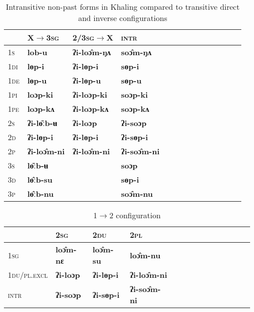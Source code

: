 \documentclass{article}
\newcommand{\ipa}[1]{{\phon\textbf{#1}}}
\newcommand{\grise}[1]{\cellcolor{lightgray}\textbf{#1}}
\newcommand{\bleu}[1]{\cellcolor{blue!30}\textbf{#1}}
\begin{document}
\begin{table}[H]
\caption{Intransitive non-past forms in Khaling compared to transitive direct and inverse configurations} \label{tab:nonloc} \centering
\begin{tabular}{llllllllllllll}
 \toprule
 &	X$\rightarrow$\textsc{3sg} &	\textsc{2/3sg}$\rightarrow$X &	\textsc{intr} &	\\	
 \midrule
\textsc{1s} &	\ipa{lob-u} \bleu{}&	\ipa{ʔi-loɔ̂m-ŋʌ} &	\ipa{soɔ̂m-ŋʌ} &	\\	
\textsc{1di} &	\ipa{lɵp-i} &	\ipa{ʔi-lɵp-i} &	\ipa{sɵp-i} &	\\	
\textsc{1de} &	\ipa{lɵp-u} &	\ipa{ʔi-lɵp-u} &	\ipa{sɵp-u} &	\\	
\textsc{1pi} &	\ipa{loɔp-ki} &	\ipa{ʔi-loɔp-ki} &	\ipa{soɔp-ki} &	\\	
\textsc{1pe} &	\ipa{loɔp-kʌ} &	\ipa{ʔi-loɔp-kʌ} &	\ipa{soɔp-kʌ} &	\\	
\textsc{2s} &	\ipa{ʔi-lɵ̄ːb-ʉ} \bleu{}&	\ipa{ʔi-loɔp} &	\ipa{ʔi-soɔp} &	\\	
\textsc{2d} &	\ipa{ʔi-lɵp-i} &	\ipa{ʔi-lɵp-i} &	\ipa{ʔi-sɵp-i} &	\\	
\textsc{2p} &	\ipa{ʔi-loɔ̂m-ni} &	\ipa{ʔi-loɔ̂m-ni} &	\ipa{ʔi-soɔ̂m-ni} &	\\	
\textsc{3s} &	\ipa{lɵ̄ːb-ʉ} \bleu{}&	 \grise{} &	\ipa{soɔp} &	\\	
\textsc{3d} &	\ipa{lɵ̂ːb-su} \bleu{}&	\grise{} &	\ipa{sɵp-i} &	\\	
\textsc{3p} &	\ipa{lɵ̂ːb-nu} \bleu{}&	\grise{} &	\ipa{soɔ̂m-nu} &	\\	
\bottomrule
\end{tabular}
\end{table}

\begin{table}[H]
\caption{1$\rightarrow$2 configuration} \label{tab:loc} \centering
\begin{tabular}{llllllllllllll}
 \toprule
  &	\textsc{2sg} &	\textsc{2du} &	\textsc{2pl} &	\\
   \midrule
\textsc{1sg} &	\ipa{loɔ̂m-nɛ} \bleu{}&	\ipa{loɔ̂m-su} \bleu{}&	\ipa{loɔ̂m-nu} \bleu{}&	\\
\textsc{1du/pl.excl }&	\ipa{ʔi-loɔp} &	\ipa{ʔi-lɵp-i} &	\ipa{ʔi-loɔ̂m-ni} &	\\
\textsc{intr} &	\ipa{ʔi-soɔp} &	\ipa{ʔi-sɵp-i} &	\ipa{ʔi-soɔ̂m-ni} &	\\
 \bottomrule
\end{tabular}
\end{table}
\end{document}
